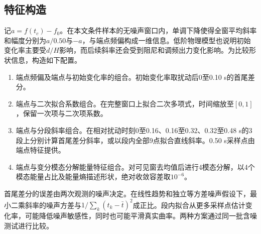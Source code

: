 \documentclass[UTF8,a4paper,11pt]{ctexart}
\begin{document}
\subsection{特征构造}
记$a=f(t_c)-f_0$。在本文条件样本的无噪声窗口内，单调下降使得全窗平均斜率和幅度分别为$a/0.50$与$-a$，与端点频偏构成一维信息。低阶物理模型也说明初始变化率主要受$d/H$影响，而后续斜率还会受到阻尼和调频出力变化影响。为比较形状信息，构造如下配置。

\begin{enumerate}
\item 端点频偏及端点与初始变化率的组合。初始变化率取扰动后0至0.10 s的首尾差分。
\item 端点与二次拟合系数组合。在完整窗口上拟合二次多项式，时间缩放至$[0,1]$，保留一次项与二次项系数。
\item 端点与分段斜率组合。在相对扰动时刻0至0.16、0.16至0.32、0.32至0.48 s的3段上分别计算首尾差分斜率，或以段内全部9点拟合直线斜率。0.50 s采样点由端点特征提供。
\item 端点与变分模态分解能量特征组合。对可见窗去均值后进行4模态分解，以4个模态能量占比及能量熵描述形状\cite{vmd}，绝对收敛容差取$10^{-6}$。
\end{enumerate}

首尾差分的误差由两次观测的噪声决定。在线性趋势和独立等方差噪声假设下，最小二乘斜率的噪声方差与$1/\sum_k(t_k-\bar t)^2$成正比。段内拟合从更多采样点估计变化率，可能降低噪声敏感性，同时也可能平滑真实曲率。两种方案通过同一批含噪测试进行比较。
\end{document}
